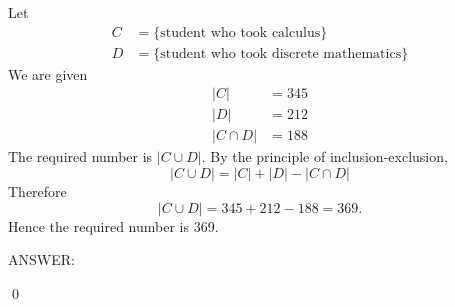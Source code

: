 Let 
\begin{align*}
C &= \{\text{student who took calculus}\} \\
D &= \{\text{student who took discrete mathematics}\}
\end{align*}
We are given
\begin{align*}
|C| &= 345 \\
|D| &= 212 \\
|C \cap D| &= 188
\end{align*}
The required number is $|C \cup D|$.
By the principle of inclusion-exclusion,
\[
|C \cup D| = |C| + |D| - |C \cap D|
\]
Therefore
\[
|C \cup D| = 345 + 212 - 188 = 369.
\]
Hence the required number is 369.

ANSWER:

\qed
